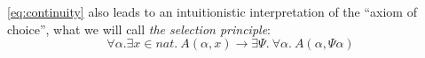 \documentclass[11pt]{article}
\begin{document}
\ref{eq:continuity} also leads to an intuitionistic interpretation of the
``axiom of choice'', what we will call \emph{the selection principle}:
\begin{equation}\label{eq:SP}
  \forall \alpha. \exists x \in nat.\ A(\alpha, x)
  \rightarrow \exists \Psi.\ \forall \alpha.\ A(\alpha, \Psi\alpha)
  \tag{SP}
\end{equation}

\LSIII



\end{document}
